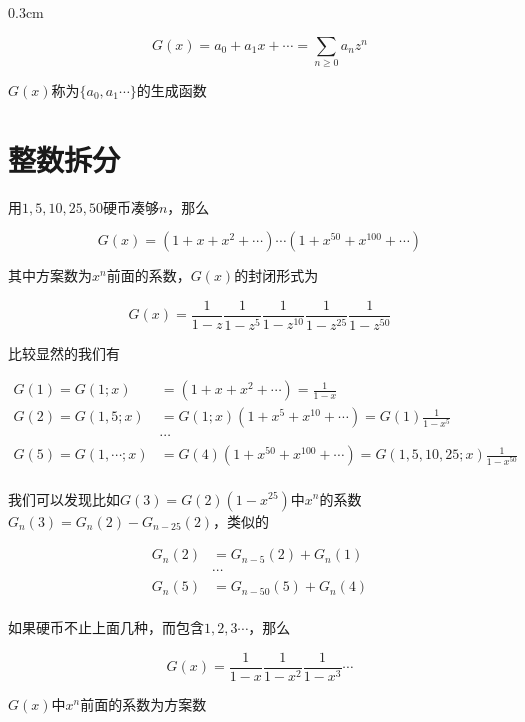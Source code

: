 \documentclass{article}
\newcommand{\setParDis}{\setlength {\parskip} {0.3cm} }
\newcommand{\nident}{\setlength{\parindent}{0pt}}
\begin{document}
\setParDis

\begin{equation}
    G(x)=a_0+a_1x+\cdots=\sum_{n\ge 0}a_nz^n
\end{equation}

$G(x)$称为$\{a_0,a_1\cdots\}$的生成函数

\section*{整数拆分}

用$1,5,10,25,50$硬币凑够$n$，那么

\begin{equation}
    G(x)=(1+x+x^2+\cdots)\cdots(1+x^{50}+x^{100}+\cdots)
\end{equation}

其中方案数为$x^n$前面的系数，$G(x)$的封闭形式为

\begin{equation}
    G(x)=\frac{1}{1-z}\frac{1}{1-z^5}\frac{1}{1-z^{10}}\frac{1}{1-z^{25}}\frac{1}{1-z^{50}}
\end{equation}

比较显然的我们有

\begin{equation}
    \begin{aligned}
    G(1)=G(1;x)&=(1+x+x^2+\cdots)=\frac{1}{1-x}\\
    G(2)=G(1,5;x)&=G(1;x)(1+x^5+x^{10}+\cdots)=G(1)\frac{1}{1-x^5}\\
    &\cdots\\
    G(5)=G(1,\cdots;x)&=G(4)(1+x^{50}+x^{100}+\cdots)=G(1,5,10,25;x)\frac{1}{1-x^{50}}\\
\end{aligned}
\end{equation}

我们可以发现比如$G(3)=G(2)(1-x^{25})$中$x^n$的系数$G_n(3)=G_n(2)-G_{n-25}(2)$，类似的

\begin{equation}
    \begin{aligned}
        G_n(2)&=G_{n-5}(2)+G_n(1)\\
        &\cdots     \\
        G_{n}(5)&=G_{n-50}(5)+G_{n}(4)\\
    \end{aligned}
\end{equation}

如果硬币不止上面几种，而包含$1,2,3\cdots$，那么

\begin{equation}
    G(x)=\frac{1}{1-x}\frac{1}{1-x^2}\frac{1}{1-x^3}\cdots
\end{equation}

$G(x)$中$x^n$前面的系数为方案数
\end{document}

